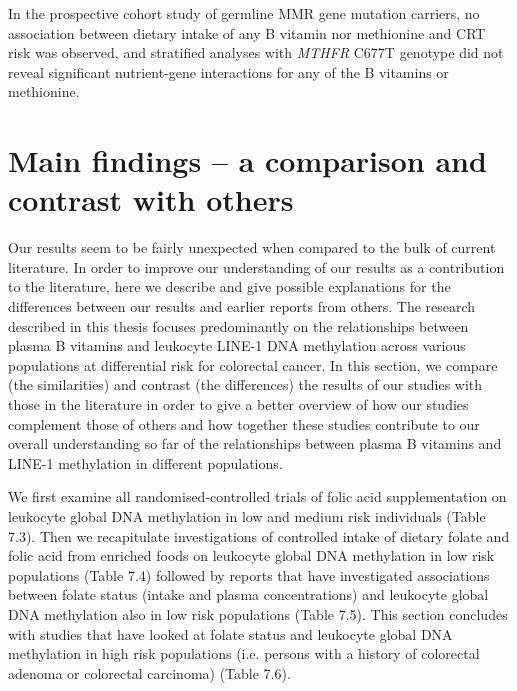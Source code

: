 \noindent In the prospective cohort study of germline MMR gene mutation carriers, no association between dietary intake of any B vitamin nor methionine and CRT risk was observed, and stratified analyses with \emph{MTHFR} C677T genotype did not reveal significant nutrient-gene interactions for any of the B vitamins or methionine. 
 
\section[]{Main findings -- a comparison and contrast with others} %
\noindent Our results seem to be fairly unexpected when compared to the bulk of current literature. In order to improve our understanding of our results as a contribution to the literature, here we describe and give possible explanations for the differences between our results and earlier reports from others. The research described in this thesis focuses predominantly on the relationships between plasma B vitamins and leukocyte LINE-1 DNA methylation across various populations at differential risk for colorectal cancer. In this section, we compare (the similarities) and contrast (the differences) the results of our studies with those in the literature in order to give a better overview of how our studies complement those of others and how together these studies contribute to our overall understanding so far of the relationships between plasma B vitamins and LINE-1 methylation in different populations. 
 
\noindent We first examine all randomised-controlled trials of folic acid supplementation on leukocyte global DNA methylation in low and medium risk individuals (Table 7.3). Then we recapitulate investigations of controlled intake of dietary folate and folic acid from enriched foods on leukocyte global DNA methylation in low risk populations (Table 7.4) followed by reports that have investigated associations between folate status (intake and plasma concentrations) and leukocyte global DNA methylation also in low risk populations (Table 7.5). This section concludes with studies that have looked at folate status and leukocyte global DNA methylation in high risk populations (i.e. persons with a history of colorectal adenoma or colorectal carcinoma) (Table 7.6). 
 
